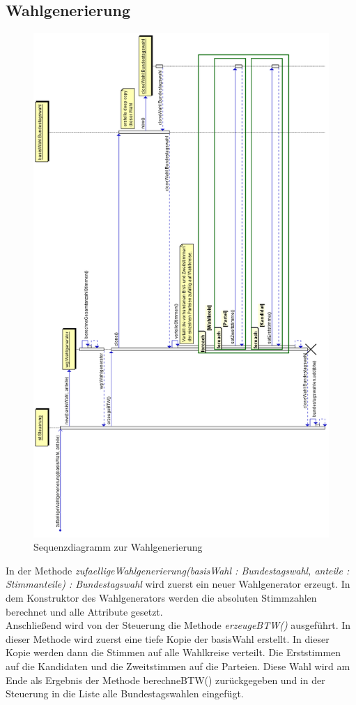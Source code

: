 \documentclass[12pt,a4paper,titlepage]{article}
\newcommand{\mymo}{\fontfamily{pcr}\selectfont \textit}
\begin{document}
\subsection{Wahlgenerierung}
\begin{figure}[!ht]
\centering
\includegraphics[scale=0.55]{Sequenzdiagramme/Wahlgenerierung.png} \caption{Sequenzdiagramm zur Wahlgenerierung}
\end{figure}
In der Methode {\mymo{zufaelligeWahlgenerierung(basisWahl : Bundestagswahl, anteile : Stimmanteile) : Bundestagswahl}} wird zuerst ein neuer Wahlgenerator erzeugt. In dem Konstruktor des Wahlgenerators werden die absoluten Stimmzahlen berechnet und alle Attribute gesetzt.\\
Anschließend wird von der Steuerung die Methode {\mymo{erzeugeBTW()}} ausgeführt. In dieser Methode wird zuerst eine tiefe Kopie der basisWahl erstellt. In dieser Kopie werden dann die Stimmen auf alle Wahlkreise verteilt. Die Erststimmen auf die Kandidaten und die Zweitstimmen auf die Parteien. Diese Wahl wird am Ende als Ergebnis der Methode berechneBTW() zurückgegeben und in der Steuerung in die Liste alle Bundestagswahlen eingefügt.
\end{document}
